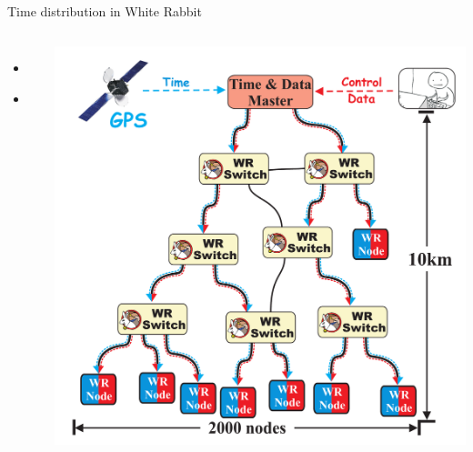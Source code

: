 \documentclass[compress,red]{beamer}
\begin{document}
\subsection{}
\begin{frame}{Time distribution in White Rabbit}


\begin{columns}[c]
 
  \begin{itemize}
    \item \textbf{\color{blue!90}{High accuracy/precision synchronization}}
    \item \color{gray}{Deterministic, reliable and low-latency Control Data delivery}
  \end{itemize}

    \begin{center}
    \includegraphics[height=1.0\textwidth]{network/wr_network-new.pdf}
    \end{center}
\end{columns}

\end{frame}
\end{document}
